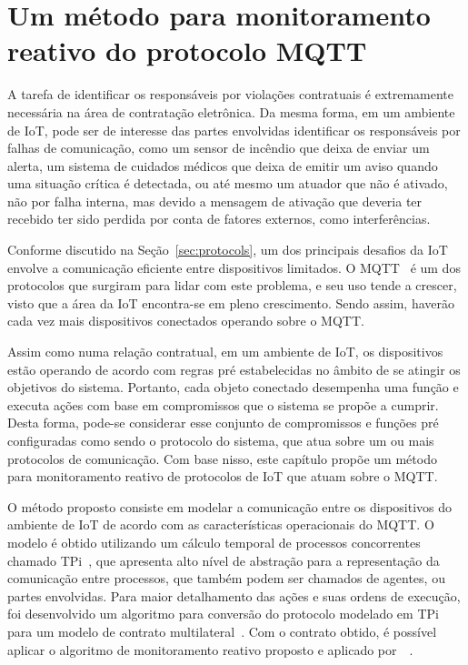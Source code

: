 \chapter{Um método para monitoramento reativo do protocolo MQTT}

A tarefa de identificar os responsáveis por violações contratuais é extremamente necessária na área de contratação eletrônica. Da mesma forma, em um ambiente de IoT, pode ser de interesse das partes envolvidas identificar os responsáveis por falhas de comunicação, como um sensor de incêndio que deixa de enviar um alerta, um sistema de cuidados médicos que deixa de emitir um aviso quando uma situação crítica é detectada, ou até mesmo um atuador que não é ativado, não por falha interna, mas devido a mensagem de ativação que deveria ter recebido ter sido perdida por conta de fatores externos, como interferências.

Conforme discutido na Seção~\ref{sec:protocols}, um dos principais desafios da IoT envolve a comunicação eficiente entre dispositivos limitados. O MQTT~\cite{mqttv3.1.1} é um dos protocolos que surgiram para lidar com este problema, e seu uso tende a crescer, visto que a área da IoT encontra-se em pleno crescimento. Sendo assim, haverão cada vez mais dispositivos conectados operando sobre o MQTT.

Assim como numa relação contratual, em um ambiente de IoT, os dispositivos estão operando de acordo com regras pré estabelecidas no âmbito de se atingir os objetivos do sistema. Portanto, cada objeto conectado desempenha uma função e executa ações com base em compromissos que o sistema se propõe a cumprir. Desta forma, pode-se considerar esse conjunto de compromissos e funções pré configuradas como sendo o protocolo do sistema, que atua sobre um ou mais protocolos de comunicação. Com base nisso, este capítulo propõe um método para monitoramento reativo de protocolos de IoT que atuam sobre o MQTT.

O método proposto consiste em modelar a comunicação entre os dispositivos do ambiente de IoT de acordo com as características operacionais do MQTT. O modelo é obtido utilizando um cálculo temporal de processos concorrentes chamado TPi~\cite{berger2003two}, que apresenta alto nível de abstração para a representação da comunicação entre processos, que também podem ser chamados de agentes, ou partes envolvidas. Para maior detalhamento das ações e suas ordens de execução, foi desenvolvido um algoritmo para conversão do protocolo modelado em TPi para um modelo de contrato multilateral~\cite{xu2004multi}. Com o contrato obtido, é possível aplicar o algoritmo de monitoramento reativo proposto e aplicado por~\citeauthor{xu2004multi}~\cite{xu2004monitoring,xu2005detection}.

